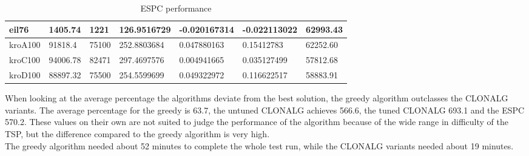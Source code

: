 \begin{table}[H]
\begin{tabular}{|l|p{2cm}|p{1.6cm}|p{2.2cm}|p{2.4cm}|p{2.4cm}|p{1.7cm}|}
		eil76     & 1405.74       & 1221       & 126.9516729     & -0.020167314            & -0.022113022      & 62993.43           \\ \hline
		kroA100   & 91818.4       & 75100      & 252.8803684     & 0.047880163             & 0.15412783        & 62252.60           \\ \hline
		kroC100   & 94006.78      & 82471      & 297.4697576     & 0.004941665             & 0.035127499       & 57812.68           \\ \hline
		kroD100   & 88897.32      & 75500      & 254.5599699     & 0.049322972             & 0.116622517       & 58883.91           \\ \hline
	\end{tabular}
	\caption{ESPC performance}
	\label{tab:espc}
\end{table}
When looking at the average percentage the algorithms deviate from the best solution, the greedy algorithm outclasses the CLONALG variants. The average percentage for the greedy is 63.7, the untuned CLONALG achieves 566.6, the tuned CLONALG 693.1 and the ESPC 570.2. These values on their own are not suited to judge the performance of the algorithm because of the wide range in difficulty of the TSP, but the difference compared to the greedy algorithm is very high.\\ The greedy algorithm needed about 52 minutes to complete the whole test run, while the CLONALG variants needed about 19 minutes.
